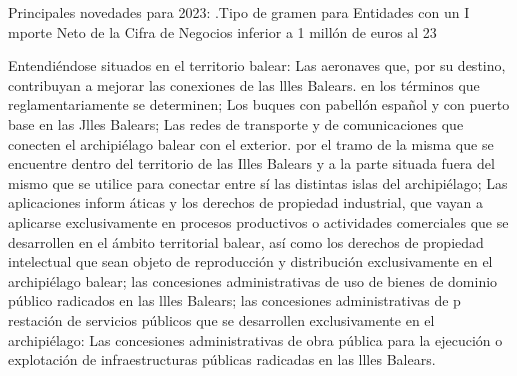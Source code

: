 \documentclass[10pt,a4paper]{article}
\begin{document}
Principales novedades para 2023: .Tipo de gramen para Entidades con un I mporte Neto de la Cifra de Negocios inferior a 1 millón de euros al 23 %

Entendiéndose situados en el territorio balear: Las aeronaves que, por su destino, contribuyan a mejorar las conexiones de las llles Balears. en los términos que reglamentariamente se determinen; Los buques con pabellón español y con puerto base en las Jlles Balears; Las redes de transporte y de comunicaciones que conecten el archipiélago balear con el exterior. por el tramo de la misma que se encuentre dentro del territorio de las Illes Balears y a la parte situada fuera del mismo que se utilice para conectar entre sí las distintas islas del archipiélago; Las aplicaciones inform áticas y los derechos de propiedad industrial, que vayan a aplicarse exclusivamente en procesos productivos o actividades comerciales que se desarrollen en el ámbito territorial balear, así como los derechos de propiedad intelectual que sean objeto de reproducción y distribución exclusivamente en el archipiélago balear; las concesiones administrativas de uso de bienes de dominio público radicados en las llles Balears; las concesiones administrativas de p restación de servicios públicos que se desarrollen exclusivamente en el archipiélago: Las concesiones administrativas de obra pública para la ejecución o explotación de infraestructuras públicas radicadas en las llles Balears.
\end{document}
